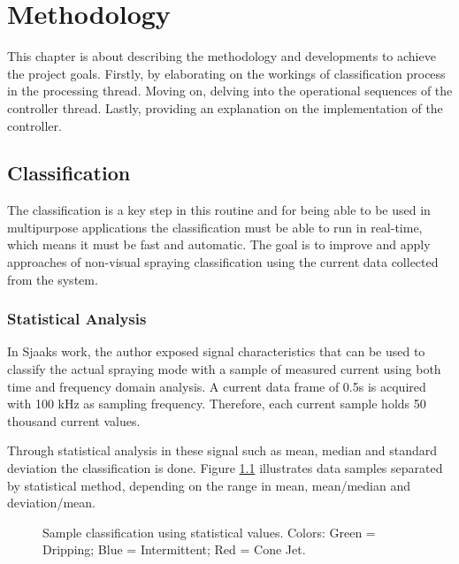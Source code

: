 \chapter{Methodology}
\label{chap:Methodology}

This chapter is about describing the methodology and developments to achieve the project goals. 
Firstly, by elaborating on the workings of classification process in the processing thread. Moving on, delving into the operational sequences of the controller thread. Lastly, providing an explanation on the implementation of the controller.


\section{Classification}
\label{sec:section_classification}

The classification is a key step in this routine and for being able to be used in multipurpose applications the classification must be able to run in real-time, which means it must be fast and automatic.
The goal is to improve and apply approaches of non-visual spraying classification using the current data collected from the system.

\subsection{Statistical Analysis}
In Sjaaks\cite{Sjaaks} work, the author exposed signal characteristics that can be used to classify the actual spraying mode with a sample of measured current using both time and frequency domain analysis.
A current data frame of 0.5s is acquired with 100 kHz as sampling frequency. Therefore, each current sample holds 50 thousand current values. 

Through statistical analysis in these signal such as mean, median and standard deviation the classification is done. 
Figure \ref{fig:sjaaks_statistical_class} illustrates data samples separated by statistical method, depending on the range in mean, mean/median and deviation/mean.

\begin{figure}[H]
    \centering
    \caption{Sample classification using statistical values. Colors: Green = Dripping; Blue = Intermittent; Red = Cone Jet.}
    \label{fig:sjaaks_statistical_class}
\end{figure}

